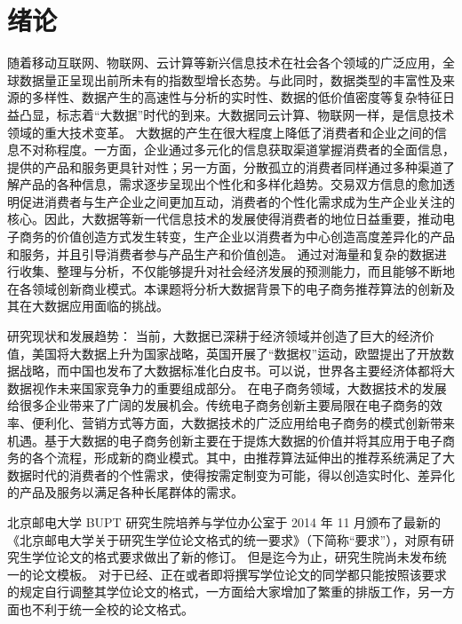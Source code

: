 
\chapter{绪论}
随着移动互联网、物联网、云计算等新兴信息技术在社会各个领域的广泛应用，全球数据量正呈现出前所未有的指数型增长态势。与此同时，数据类型的丰富性及来源的多样性、数据产生的高速性与分析的实时性、数据的低价值密度等复杂特征日益凸显，标志着“大数据”时代的到来。大数据同云计算、物联网一样，是信息技术领域的重大技术变革。
大数据的产生在很大程度上降低了消费者和企业之间的信息不对称程度。一方面，企业通过多元化的信息获取渠道掌握消费者的全面信息，提供的产品和服务更具针对性；另一方面，分散孤立的消费者同样通过多种渠道了解产品的各种信息，需求逐步呈现出个性化和多样化趋势。交易双方信息的愈加透明促进消费者与生产企业之间更加互动，消费者的个性化需求成为生产企业关注的核心。因此，大数据等新一代信息技术的发展使得消费者的地位日益重要，推动电子商务的价值创造方式发生转变，生产企业以消费者为中心创造高度差异化的产品和服务，并且引导消费者参与产品生产和价值创造。
通过对海量和复杂的数据进行收集、整理与分析，不仅能够提升对社会经济发展的预测能力，而且能够不断地在各领域创新商业模式。本课题将分析大数据背景下的电子商务推荐算法的创新及其在大数据应用面临的挑战。

研究现状和发展趋势：
当前，大数据已深耕于经济领域并创造了巨大的经济价值，美国将大数据上升为国家战略，英国开展了“数据权”运动，欧盟提出了开放数据战略，而中国也发布了大数据标准化白皮书。可以说，世界各主要经济体都将大数据视作未来国家竞争力的重要组成部分。
在电子商务领域，大数据技术的发展给很多企业带来了广阔的发展机会。传统电子商务创新主要局限在电子商务的效率、便利化、营销方式等方面，大数据技术的广泛应用给电子商务的模式创新带来机遇。基于大数据的电子商务创新主要在于提炼大数据的价值并将其应用于电子商务的各个流程，形成新的商业模式\cite{大数据背景下电子商务的价值创造与模式创新}。其中，由推荐算法延伸出的推荐系统满足了大数据时代的消费者的个性需求，使得按需定制变为可能，得以创造实时化、差异化的产品及服务以满足各种长尾群体的需求。

北京邮电大学 \gls*{BUPT} 研究生院培养与学位办公室于 2014 年 11 月颁布了最新的《北京邮电大学关于研究生学位论文格式的统一要求》（下简称“要求”）\cite{BUPT_Thesis_Format_2014}，对原有研究生学位论文的格式要求做出了新的修订。
但是迄今为止，研究生院尚未发布统一的论文模板。
对于已经、正在或者即将撰写学位论文的同学都只能按照该要求的规定自行调整其学位论文的格式，一方面给大家增加了繁重的排版工作，另一方面也不利于统一全校的论文格式。

